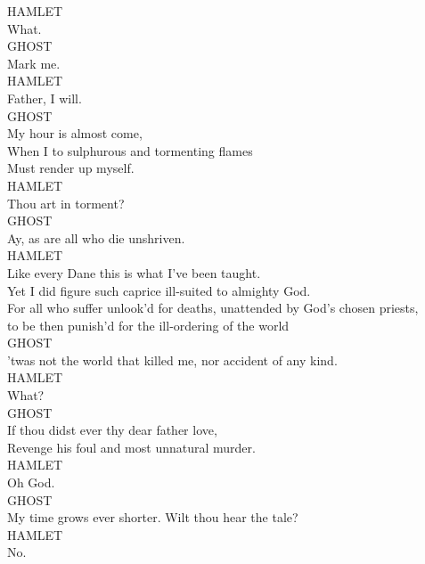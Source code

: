 \noindent{}HAMLET\\
What.\\

\noindent{}GHOST\\
Mark me.\\

\noindent{}HAMLET\\
Father, I will.\\

\noindent{}GHOST\\
My hour is almost come,\\
When I to sulphurous and tormenting flames\\
Must render up myself.\\

\noindent{}HAMLET\\
Thou art in torment?\\

\noindent{}GHOST\\
Ay, as are all who die unshriven.\\

\noindent{}HAMLET\\
Like every Dane this is what I've been taught.\\
Yet I did figure such caprice ill-suited to almighty God.\\
For all who suffer unlook'd for deaths, unattended by God's chosen priests,\\
to be then punish'd for the ill-ordering of the world{\el}\\

\noindent{}GHOST\\
'twas not the world that killed me, nor accident of any kind.\\

\noindent{}HAMLET\\
What?\\

\noindent{}GHOST\\
If thou didst ever thy dear father love,\\
Revenge his foul and most unnatural murder.\\

\noindent{}HAMLET\\
Oh God.\\

\noindent{}GHOST\\
My time grows ever shorter. Wilt thou hear the tale?\\

\noindent{}HAMLET\\
No.\\

